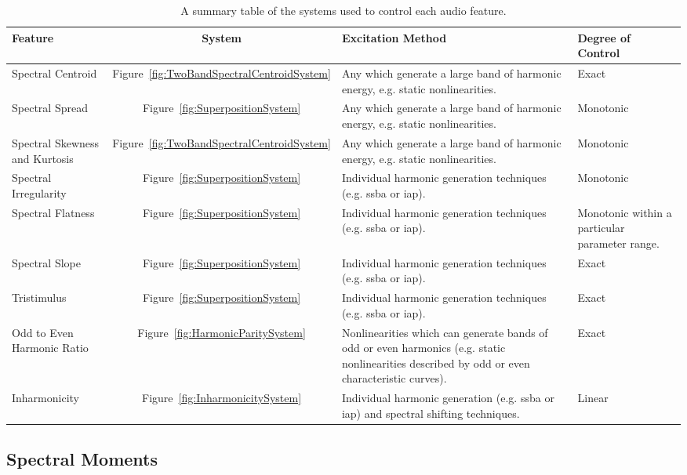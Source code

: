 		\begin{table}[h!]
			\centering
			\begin{tabular}{|C{3cm}|c|C{5cm}|C{3cm}|}
				\hline
				\bf{Feature} & \bf{System} & \bf{Excitation Method} & \bf{Degree of Control} 
				\tabularnewline
				\hline
				\hline
				Spectral Centroid & Figure~\ref{fig:TwoBandSpectralCentroidSystem} & 
				Any which generate a large band of harmonic energy, e.g. static nonlinearities. & 
				Exact \tabularnewline
				\hline
				Spectral Spread & Figure~\ref{fig:SuperpositionSystem} & 
				Any which generate a large band of harmonic energy, e.g. static nonlinearities. & 
				Monotonic \tabularnewline
				\hline
				Spectral Skewness and Kurtosis & Figure~\ref{fig:TwoBandSpectralCentroidSystem} & 
				Any which generate a large band of harmonic energy, e.g. static nonlinearities. & 
				Monotonic \tabularnewline
				\hline
				Spectral Irregularity & Figure~\ref{fig:SuperpositionSystem} & 
				Individual harmonic generation techniques (e.g. \acrshort{ssba} or \acrshort{iap}). & 
				Monotonic \tabularnewline
				\hline
				Spectral Flatness & Figure~\ref{fig:SuperpositionSystem} &
				Individual harmonic generation techniques (e.g. \acrshort{ssba} or \acrshort{iap}). & 
				Monotonic within a particular parameter range. \tabularnewline
				\hline
				Spectral Slope & Figure~\ref{fig:SuperpositionSystem} &
				Individual harmonic generation techniques (e.g. \acrshort{ssba} or \acrshort{iap}). & 
				Exact \tabularnewline
				\hline
				Tristimulus & Figure~\ref{fig:SuperpositionSystem} & 
				Individual harmonic generation techniques (e.g. \acrshort{ssba} or \acrshort{iap}). & 
				Exact \tabularnewline			
				\hline
				Odd to Even Harmonic Ratio & Figure~\ref{fig:HarmonicParitySystem} &
				Nonlinearities which can generate bands of odd or even harmonics
				(e.g. static nonlinearities described by odd or even characteristic curves). & 
				Exact \tabularnewline
				\hline
				Inharmonicity & Figure~\ref{fig:InharmonicitySystem} & 
				Individual harmonic generation (e.g. \acrshort{ssba} or \acrshort{iap}) 
				and spectral shifting techniques. & Linear \tabularnewline
				\hline
			\end{tabular}
			\caption{A summary table of the systems used to control each audio feature.}
			\label{tab:FeatureControlSummary}
		\end{table}
	
	\newpage

	\subsection{Spectral Moments}
	\label{sec:FeatureControl-Parameterisation-SpectralMoments}
